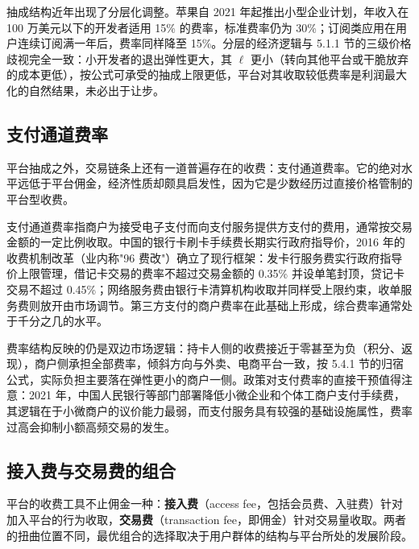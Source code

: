 抽成结构近年出现了分层化调整。苹果自 2021 年起推出小型企业计划，年收入在 100 万美元以下的开发者适用 15\% 的费率，标准费率仍为 30\%；订阅类应用在用户连续订阅满一年后，费率同样降至 15\%。分层的经济逻辑与 5.1.1 节的三级价格歧视完全一致：小开发者的退出弹性更大，其 $\ell$ 更小（转向其他平台或干脆放弃的成本更低），按公式可承受的抽成上限更低，平台对其收取较低费率是利润最大化的自然结果，未必出于让步。

\subsection{支付通道费率}

平台抽成之外，交易链条上还有一道普遍存在的收费：支付通道费率。它的绝对水平远低于平台佣金，经济性质却颇具启发性，因为它是少数经历过直接价格管制的平台型收费。

支付通道费率指商户为接受电子支付而向支付服务提供方支付的费用，通常按交易金额的一定比例收取。中国的银行卡刷卡手续费长期实行政府指导价，2016 年的收费机制改革（业内称"96 费改"）确立了现行框架：发卡行服务费实行政府指导价上限管理，借记卡交易的费率不超过交易金额的 0.35\% 并设单笔封顶，贷记卡交易不超过 0.45\%；网络服务费由银行卡清算机构收取并同样受上限约束，收单服务费则放开由市场调节。第三方支付的商户费率在此基础上形成，综合费率通常处于千分之几的水平。

费率结构反映的仍是双边市场逻辑：持卡人侧的收费接近于零甚至为负（积分、返现），商户侧承担全部费率，倾斜方向与外卖、电商平台一致，按 5.4.1 节的归宿公式，实际负担主要落在弹性更小的商户一侧。政策对支付费率的直接干预值得注意：2021 年，中国人民银行等部门部署降低小微企业和个体工商户支付手续费，其逻辑在于小微商户的议价能力最弱，而支付服务具有较强的基础设施属性，费率过高会抑制小额高频交易的发生。

\subsection{接入费与交易费的组合}

平台的收费工具不止佣金一种：\textbf{接入费}（access fee，包括会员费、入驻费）针对加入平台的行为收取，\textbf{交易费}（transaction fee，即佣金）针对交易量收取。两者的扭曲位置不同，最优组合的选择取决于用户群体的结构与平台所处的发展阶段。

